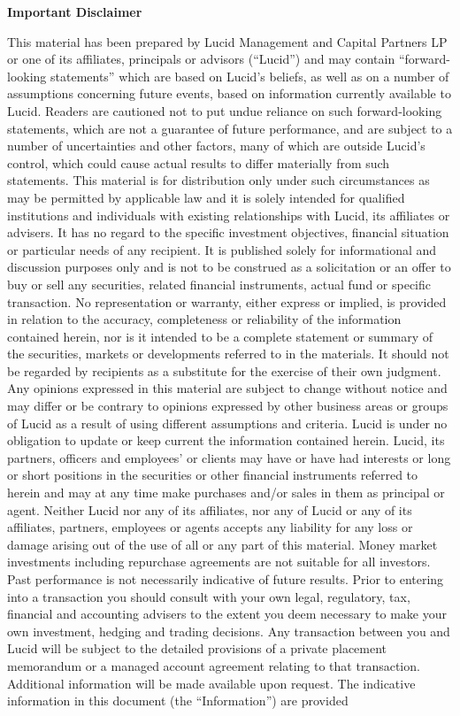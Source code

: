 \documentclass[9pt]{article}
\begin{document}
    \noindent\textbf{\color{lucid_blue}Important Disclaimer}

    \scriptsize

    \noindent This material has been prepared by Lucid Management and Capital Partners LP or one of its affiliates, principals or advisors (``Lucid'') and may contain ``forward-looking statements'' which are based on Lucid's beliefs, as well as on a number of assumptions concerning future events, based on information currently available to Lucid. Readers are cautioned not to put undue reliance on such forward-looking statements, which are not a guarantee of future performance, and are subject to a number of uncertainties and other factors, many of which are outside Lucid's control, which could cause actual results to differ materially from such statements. This material is for distribution only under such circumstances as may be permitted by applicable law and it is solely intended for qualified institutions and individuals with existing relationships with Lucid, its affiliates or advisers. It has no regard to the specific investment objectives, financial situation or particular needs of any recipient. It is published solely for informational and discussion purposes only and is not to be construed as a solicitation or an offer to buy or sell any securities, related financial instruments, actual fund or specific transaction. No representation or warranty, either express or implied, is provided in relation to the accuracy, completeness or reliability of the information contained herein, nor is it intended to be a complete statement or summary of the securities, markets or developments referred to in the materials. It should not be regarded by recipients as a substitute for the exercise of their own judgment. Any opinions expressed in this material are subject to change without notice and may differ or be contrary to opinions expressed by other business areas or groups of Lucid as a result of using different assumptions and criteria. Lucid is under no obligation to update or keep current the information contained herein. Lucid, its partners, officers and employees' or clients may have or have had interests or long or short positions in the securities or other financial instruments referred to herein and may at any time make purchases and/or sales in them as principal or agent. Neither Lucid nor any of its affiliates, nor any of Lucid or any of its affiliates, partners, employees or agents accepts any liability for any loss or damage arising out of the use of all or any part of this material. Money market investments including repurchase agreements are not suitable for all investors. Past performance is not necessarily indicative of future results. Prior to entering into a transaction you should consult with your own legal, regulatory, tax, financial and accounting advisers to the extent you deem necessary to make your own investment, hedging and trading decisions. Any transaction between you and Lucid will be subject to the detailed provisions of a private placement memorandum or a managed account agreement relating to that transaction. Additional information will be made available upon request. The indicative information in this document (the ``Information'') are provided 
\end{document}
